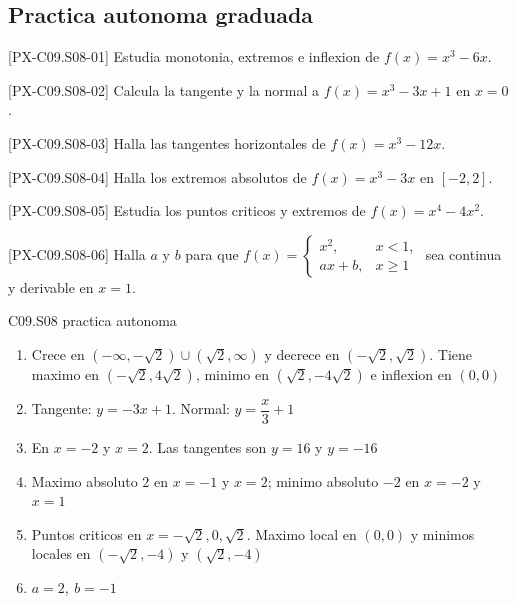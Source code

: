 \subsection*{Practica autonoma graduada}
\begin{exercise}{[PX-C09.S08-01] Estudia monotonia, extremos e inflexion de \(f(x)=x^3-6x\).}
\end{exercise}
\begin{exercise}{[PX-C09.S08-02] Calcula la tangente y la normal a \(f(x)=x^3-3x+1\) en \(x=0\).}
\end{exercise}
\begin{exercise}{[PX-C09.S08-03] Halla las tangentes horizontales de \(f(x)=x^3-12x\).}
\end{exercise}
\begin{exercise}{[PX-C09.S08-04] Halla los extremos absolutos de \(f(x)=x^3-3x\) en \([-2,2]\).}
\end{exercise}
\begin{exercise}{[PX-C09.S08-05] Estudia los puntos criticos y extremos de \(f(x)=x^4-4x^2\).}
\end{exercise}
\begin{exercise}{[PX-C09.S08-06] Halla \(a\) y \(b\) para que
\(
f(x)=
\begin{cases}
x^2,& x<1,\\
ax+b,& x\geq 1
\end{cases}
\)
sea continua y derivable en \(x=1\).}
\end{exercise}

\begin{shortanswer}{C09.S08 practica autonoma}
\begin{enumerate}[label=\textbf{PX-C09.S08-\arabic*:}, leftmargin=*]
  \item Crece en \((-\infty,-\sqrt{2})\cup(\sqrt{2},\infty)\) y decrece en
  \((-\sqrt{2},\sqrt{2})\). Tiene maximo en \((-\sqrt{2},4\sqrt{2})\),
  minimo en \((\sqrt{2},-4\sqrt{2})\) e inflexion en \((0,0)\)
  \item Tangente: \(y=-3x+1\). Normal: \(y=\dfrac{x}{3}+1\)
  \item En \(x=-2\) y \(x=2\). Las tangentes son \(y=16\) y \(y=-16\)
  \item Maximo absoluto \(2\) en \(x=-1\) y \(x=2\); minimo absoluto \(-2\) en \(x=-2\) y
  \(x=1\)
  \item Puntos criticos en \(x=-\sqrt{2},0,\sqrt{2}\). Maximo local en \((0,0)\) y minimos
  locales en \((-\sqrt{2},-4)\) y \((\sqrt{2},-4)\)
  \item \(a=2,\ b=-1\)
\end{enumerate}
\end{shortanswer}

